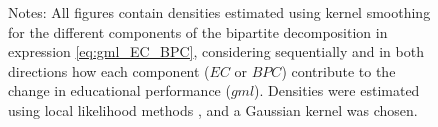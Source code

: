 \documentclass[11pt,a4paper,oneside]{article}
\begin{document}
\begin{figure}[htbp]
\vspace{.3cm}


\parbox[t]{155mm}{\footnotesize Notes: All figures contain densities estimated using kernel smoothing for the different components of the bipartite decomposition in expression \eqref{eq:gml_EC_BPC}, considering sequentially and in both directions how each component ($EC$ or $BPC$) contribute to the change in educational performance ($gml$). Densities were estimated using local likelihood methods \citep{loader1996local.annals}, and a Gaussian kernel was chosen.}

\end{figure}



\pagebreak
\clearpage
\end{document}
